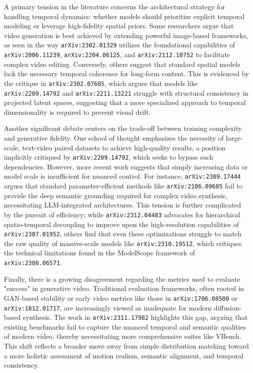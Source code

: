 \documentclass[11pt]{article}
\begin{document}
A primary tension in the literature concerns the architectural strategy for handling temporal dynamics: whether models should prioritize explicit temporal modeling or leverage high-fidelity spatial priors. Some researchers argue that video generation is best achieved by extending powerful image-based frameworks, as seen in the way \texttt{arXiv:2302.01329} utilizes the foundational capabilities of \texttt{arXiv:2006.11239}, \texttt{arXiv:2204.06125}, and \texttt{arXiv:2112.10752} to facilitate complex video editing. Conversely, others suggest that standard spatial models lack the necessary temporal coherence for long-form content. This is evidenced by the critique in \texttt{arXiv:2302.07685}, which argues that models like \texttt{arXiv:2209.14792} and \texttt{arXiv:2211.13221} struggle with structural consistency in projected latent spaces, suggesting that a more specialized approach to temporal dimensionality is required to prevent visual drift.

Another significant debate centers on the trade-off between training complexity and generative fidelity. One school of thought emphasizes the necessity of large-scale, text-video paired datasets to achieve high-quality results, a position implicitly critiqued by \texttt{arXiv:2209.14792}, which seeks to bypass such dependencies. However, more recent work suggests that simply increasing data or model scale is insufficient for nuanced control. For instance, \texttt{arXiv:2309.17444} argues that standard parameter-efficient methods like \texttt{arXiv:2106.09685} fail to provide the deep semantic grounding required for complex video synthesis, necessitating LLM-integrated architectures. This tension is further complicated by the pursuit of efficiency; while \texttt{arXiv:2312.04483} advocates for hierarchical spatio-temporal decoupling to improve upon the high-resolution capabilities of \texttt{arXiv:2307.01952}, others find that even these optimizations struggle to match the raw quality of massive-scale models like \texttt{arXiv:2310.19512}, which critiques the technical limitations found in the ModelScope framework of \texttt{arXiv:2308.06571}.

Finally, there is a growing disagreement regarding the metrics used to evaluate "success" in generative video. Traditional evaluation frameworks, often rooted in GAN-based stability or early video metrics like those in \texttt{arXiv:1706.08500} or \texttt{arXiv:1812.01717}, are increasingly viewed as inadequate for modern diffusion-based synthesis. The work in \texttt{arXiv:2311.17982} highlights this gap, arguing that existing benchmarks fail to capture the nuanced temporal and semantic qualities of modern video, thereby necessitating more comprehensive suites like VBench. This shift reflects a broader move away from simple distribution matching toward a more holistic assessment of motion realism, semantic alignment, and temporal consistency.
\end{document}
